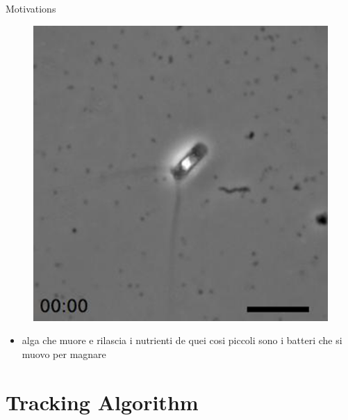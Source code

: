 \documentclass{beamer}
\begin{document}
	
		\begin{frame}{Motivations}
				\begin{figure}
					\centering
					\includegraphics[scale=0.30]{./images/motivations3.png}
				\end{figure}

				\begin{itemize}
				\item alga che muore e rilascia i nutrienti de quei cosi piccoli sono i batteri che si muovo per magnare
				\end{itemize}

	\end{frame}
	
	

\section{Tracking Algorithm}
\end{document}

